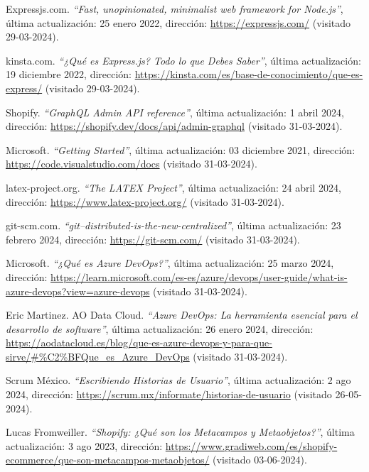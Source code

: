 \documentclass[11pt]{article}
\begin{document}
\begin{thebibliography}{100}
    Expressjs.com.
    \textit{``Fast, unopinionated, minimalist web framework for Node.js''}, última actualización: 25 enero 2022, dirección: \url{https://expressjs.com/} (visitado 29-03-2024).

    kinsta.com.
    \textit{``¿Qué es Express.js? Todo lo que Debes Saber''}, última actualización: 19 diciembre 2022, dirección: \url{https://kinsta.com/es/base-de-conocimiento/que-es-express/} (visitado 29-03-2024).
    
    Shopify.
    \textit{``GraphQL Admin API reference''}, última actualización: 1 abril 2024, dirección: \url{https://shopify.dev/docs/api/admin-graphql} (visitado 31-03-2024).

    Microsoft.
    \textit{``Getting Started''}, última actualización: 03 diciembre 2021, dirección: \url{https://code.visualstudio.com/docs} (visitado 31-03-2024).

    latex-project.org.
    \textit{``The LATEX Project''}, última actualización: 24 abril 2024, dirección: \url{https://www.latex-project.org/} (visitado 31-03-2024).

    git-scm.com.
    \textit{``git--distributed-is-the-new-centralized''}, última actualización: 23 febrero 2024, dirección: \url{https://git-scm.com/} (visitado 31-03-2024).

    Microsoft.
    \textit{``¿Qué es Azure DevOps?''}, última actualización: 25 marzo 2024, dirección: \url{https://learn.microsoft.com/es-es/azure/devops/user-guide/what-is-azure-devops?view=azure-devops} (visitado 31-03-2024).

    Eric Martinez. AO Data Cloud.
    \textit{``Azure DevOps: La herramienta esencial para el desarrollo de software''}, última actualización: 26 enero 2024, dirección: \url{https://aodatacloud.es/blog/que-es-azure-devops-y-para-que-sirve/#%C2%BFQue_es_Azure_DevOps} (visitado 31-03-2024).

    Scrum México.
    \textit{``Escribiendo Historias de Usuario''}, última actualización: 2 ago 2024, dirección: \url{https://scrum.mx/informate/historias-de-usuario} (visitado 26-05-2024).

    Lucas Fromweiller.
    \textit{``Shopify: ¿Qué son los Metacampos y Metaobjetos?''}, última actualización: 3 ago 2023, dirección: \url{https://www.gradiweb.com/es/shopify-ecommerce/que-son-metacampos-metaobjetos/} (visitado 03-06-2024).


\end{thebibliography}
\end{document}
